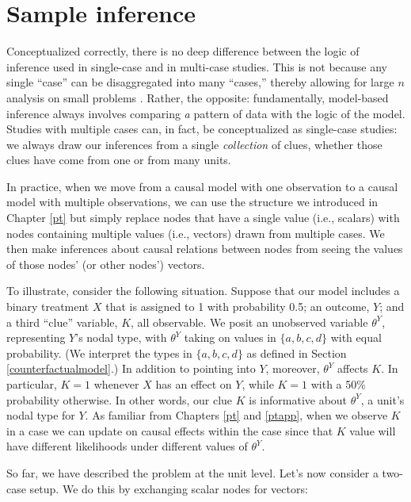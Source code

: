 \documentclass[
  12pt,
]{book}
\begin{document}
\hypertarget{sample-inference}{%
\section{Sample inference}\label{sample-inference}}

Conceptualized correctly, there is no deep difference between the logic of inference used in single-case and in multi-case studies. This is not because any single ``case'' can be disaggregated into many ``cases,'' thereby allowing for large \(n\) analysis on small problems \citep{king1994designing}. Rather, the opposite: fundamentally, model-based inference always involves comparing \emph{a} pattern of data with the logic of the model. Studies with multiple cases can, in fact, be conceptualized as single-case studies: we always draw our inferences from a single \emph{collection} of clues, whether those clues have come from one or from many units.

In practice, when we move from a causal model with one observation to a causal model with multiple observations, we can use the structure we introduced in Chapter \ref{pt} but simply replace nodes that have a single value (i.e., scalars) with nodes containing multiple values (i.e., vectors) drawn from multiple cases. We then make inferences about causal relations between nodes from seeing the values of those nodes' (or other nodes') vectors.

To illustrate, consider the following situation. Suppose that our model includes a binary treatment \(X\) that is assigned to 1 with probability 0.5; an outcome, \(Y\); and a third ``clue'' variable, \(K\), all observable. We posit an unobserved variable \(\theta^Y\), representing \(Y\)'s nodal type, with \(\theta^Y\) taking on values in \(\{a,b,c,d\}\) with equal probability. (We interpret the types in \(\{a,b,c,d\}\) as defined in Section \ref{counterfactualmodel}.) In addition to pointing into \(Y\), moreover, \(\theta^Y\) affects \(K\). In particular, \(K=1\) whenever \(X\) has an effect on \(Y\), while \(K=1\) with a 50\% probability otherwise. In other words, our clue \(K\) is informative about \(\theta^Y\), a unit's nodal type for \(Y\). As familiar from Chapters \ref{pt} and \ref{ptapp}, when we observe \(K\) in a case we can update on causal effects within the case since that \(K\) value will have different likelihoods under different values of \(\theta^Y\).

So far, we have described the problem at the unit level. Let's now consider a two-case setup. We do this by exchanging scalar nodes for vectors:
\end{document}
